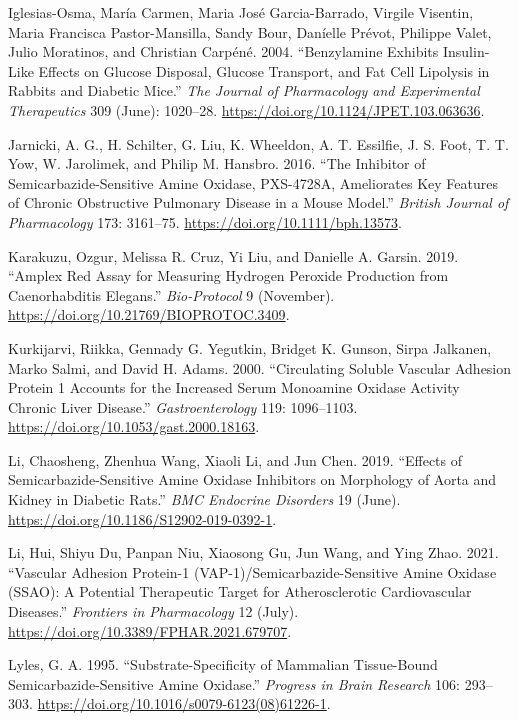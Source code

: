 \documentclass[
  letterpaper,
  DIV=11,
  numbers=noendperiod]{scrreprt}
\newlength{\cslhangindent}
\newenvironment{CSLReferences}[2] %
 {\begin{list}{}{%
  \setlength{\itemindent}{0pt}
  \setlength{\leftmargin}{0pt}
  \setlength{\parsep}{0pt}
  \ifodd #1
   \setlength{\leftmargin}{\cslhangindent}
   \setlength{\itemindent}{-1\cslhangindent}
  \fi
  \setlength{\itemsep}{#2\baselineskip}}}
 {\end{list}}
\begin{document}
\begin{CSLReferences}{1}{0}
Iglesias-Osma, María Carmen, Maria José Garcia-Barrado, Virgile
Visentin, Maria Francisca Pastor-Mansilla, Sandy Bour, Daníelle Prévot,
Philippe Valet, Julio Moratinos, and Christian Carpéné. 2004.
{``Benzylamine Exhibits Insulin-Like Effects on Glucose Disposal,
Glucose Transport, and Fat Cell Lipolysis in Rabbits and Diabetic
Mice.''} \emph{The Journal of Pharmacology and Experimental
Therapeutics} 309 (June): 1020--28.
\url{https://doi.org/10.1124/JPET.103.063636}.

Jarnicki, A. G., H. Schilter, G. Liu, K. Wheeldon, A. T. Essilfie, J. S.
Foot, T. T. Yow, W. Jarolimek, and Philip M. Hansbro. 2016. {``The
Inhibitor of Semicarbazide-Sensitive Amine Oxidase, PXS-4728A,
Ameliorates Key Features of Chronic Obstructive Pulmonary Disease in a
Mouse Model.''} \emph{British Journal of Pharmacology} 173: 3161--75.
\url{https://doi.org/10.1111/bph.13573}.

Karakuzu, Ozgur, Melissa R. Cruz, Yi Liu, and Danielle A. Garsin. 2019.
{``Amplex Red Assay for Measuring Hydrogen Peroxide Production from
Caenorhabditis Elegans.''} \emph{Bio-Protocol} 9 (November).
\url{https://doi.org/10.21769/BIOPROTOC.3409}.

Kurkijarvi, Riikka, Gennady G. Yegutkin, Bridget K. Gunson, Sirpa
Jalkanen, Marko Salmi, and David H. Adams. 2000. {``Circulating Soluble
Vascular Adhesion Protein 1 Accounts for the Increased Serum Monoamine
Oxidase Activity Chronic Liver Disease.''} \emph{Gastroenterology} 119:
1096--1103. \url{https://doi.org/10.1053/gast.2000.18163}.

Li, Chaosheng, Zhenhua Wang, Xiaoli Li, and Jun Chen. 2019. {``Effects
of Semicarbazide-Sensitive Amine Oxidase Inhibitors on Morphology of
Aorta and Kidney in Diabetic Rats.''} \emph{BMC Endocrine Disorders} 19
(June). \url{https://doi.org/10.1186/S12902-019-0392-1}.

Li, Hui, Shiyu Du, Panpan Niu, Xiaosong Gu, Jun Wang, and Ying Zhao.
2021. {``Vascular Adhesion Protein-1 (VAP-1)/Semicarbazide-Sensitive
Amine Oxidase (SSAO): A Potential Therapeutic Target for Atherosclerotic
Cardiovascular Diseases.''} \emph{Frontiers in Pharmacology} 12 (July).
\url{https://doi.org/10.3389/FPHAR.2021.679707}.

Lyles, G. A. 1995. {``Substrate-Specificity of Mammalian Tissue-Bound
Semicarbazide-Sensitive Amine Oxidase.''} \emph{Progress in Brain
Research} 106: 293--303.
\url{https://doi.org/10.1016/s0079-6123(08)61226-1}.


\end{CSLReferences}
\end{document}
